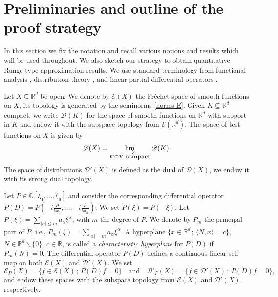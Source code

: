 \documentclass[12pt]{amsart}
\newcommand{\R}{\mathbb{R}}
\newcommand{\C}{\mathbb{C}}
\theoremstyle{definition}
\theoremstyle{remark}
\numberwithin{equation}{section}
\begin{document}
\section{Preliminaries and outline of the proof strategy}\label{sec: prelim}

In this section we fix the notation and  recall various notions and results which will be used throughout. We also  sketch  our strategy to obtain quantitative Runge type approximation results. We use standard terminology from functional analysis \cite{Jarchow1981, M-V}, distribution theory \cite{HoermanderPDO1}, and linear partial differential operators \cite{HoermanderPDO2}.  

Let $X \subseteq \R^d$ be open.  We denote by $\mathscr{E}(X)$ the Fr\'echet space of smooth  functions on $X$, its topology is generated by the seminorms \eqref{norms-E}. Given $K \subseteq \R^d$ compact, we write $\mathscr{D}(K)$ for the space of smooth functions on $\R^d$ with support in $K$ and endow it with the subspace topology from $\mathscr{E}(\R^d)$. The space of test functions on $X$ is given by
$$
\mathscr{D}(X) = \varinjlim_{\tiny{K \subseteq X \mbox{ compact}}} \mathscr{D}(K).
$$
The space of distributions $\mathscr{D}'(X)$ is defined as the dual of $\mathscr{D}(X)$, we  endow it with its strong dual topology.

Let $P \in \C[\xi_1, \ldots, \xi_d]$ and consider the corresponding  differential operator $P(D)=P(-i\frac{\partial}{\partial x_1},\ldots,-i\frac{\partial}{\partial x_d})$. We set $\check{P}(\xi)=P(-\xi)$.  Let $P(\xi)=\sum_{|\alpha| \leq m}a_\alpha\xi^\alpha$, with $m$ the degree of $P$. We denote by $P_m$ the principal part of $P$, i.e., $P_m(\xi)=\sum_{|\alpha|=m}a_\alpha\xi^\alpha$. 
A hyperplane $\{x\in\R^d \,;\,\langle N,x\rangle=c\}$, $N \in\R^d\backslash\{0\}$, $c\in\R$, is called  a \emph{characteristic hyperplane} for $P(D)$ if  $P_m(N)=0$. The differential operator $P(D)$ defines a continuous linear self map on both $\mathscr{E}(X)$  and $\mathscr{D}'(X)$. We set 
$$\mathscr{E}_P(X)=\{f\in\mathscr{E}(X) \,;\, P(D)f=0\} \quad \mbox{and} \quad \mathscr{D}'_P(X)=\{f\in\mathscr{D}'(X) \,;\, P(D)f=0\},$$
and endow these spaces with the subspace topology from $\mathscr{E}(X)$ and $\mathscr{D}'(X)$, respectively. 
\end{document}
